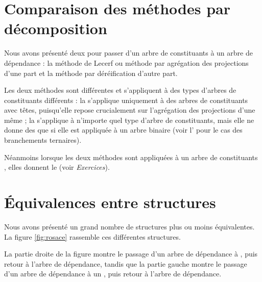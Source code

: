 \section{Comparaison des méthodes par décomposition}\label{sec:3.4.24}

Nous avons présenté deux  pour passer d’un arbre de constituants à un arbre de dépendance : la méthode de Lecerf ou méthode par agrégation des projections d’une part et la méthode par déréification d’autre part.

Les deux méthodes sont différentes et s’appliquent à des types d’arbres de constituants différents : la  s’applique uniquement à des arbres de constituants avec têtes, puisqu’elle repose crucialement sur l’agrégation des projections d’une même ; la  s’applique à n’importe quel type d’arbre de constituants, mais elle ne donne des  que si elle est appliquée à un arbre binaire (voir l’ pour le cas des branchements ternaires).

Néanmoins lorsque les deux méthodes sont appliquées à un arbre de constituants , elles donnent le  (voir \textit{Exercices}).

\section{Équivalences entre structures}\label{sec:3.4.25}

Nous avons présenté un grand nombre de structures plus ou moins équivalentes. La figure \ref{fig:rosace} rassemble ces différentes structures.

La partie droite de la figure montre le passage d’un arbre de dépendance à , puis retour à l’arbre de dépendance, tandis que la partie gauche montre le passage d’un arbre de dépendance à un , puis retour à l’arbre de dépendance.

